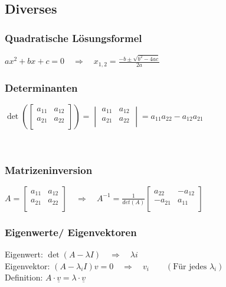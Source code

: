 	\subsection{Diverses}	
	\begin{minipage}[t]{9.5cm}
		\subsubsection{Quadratische Lösungsformel}
			$ax^2+bx+c=0\quad\Rightarrow\quad x_{1,2}=\frac{-b\pm\sqrt{b^2-4ac}}{2a}$
	\end{minipage}
	\hfill
	\begin{minipage}[t]{9.5cm}
		\subsubsection{Determinanten}
			$\det\left(
			\begin{bmatrix}
				a_{11}&a_{12}\\
				a_{21}&a_{22}\\
			\end{bmatrix}\right)=
			\begin{vmatrix}
				a_{11}&a_{12}\\
				a_{21}&a_{22}\\
			\end{vmatrix}=a_{11}a_{22}-a_{12}a_{21}$
	\end{minipage}\\
	
	
	\begin{minipage}[t]{9.5cm}
		\subsubsection{Matrizeninversion}
			$A=\begin{bmatrix}
						a_{11}&a_{12}\\
						a_{21}&a_{22}\\
				\end{bmatrix}\quad\Rightarrow\quad
			A^{-1}=\frac{1}{det(A)}
			\begin{bmatrix}
				a_{22}&-a_{12}\\
				-a_{21}&a_{11}\\
			\end{bmatrix}$
	\end{minipage}
	\hfill
	\begin{minipage}[t]{9.5cm}
		\subsubsection{Eigenwerte/ Eigenvektoren}
			Eigenwert: $\det(A-\lambda I)\quad\Rightarrow\quad \lambda i$\\
			Eigenvektor: $(A-\lambda_i I)v=0\quad\Rightarrow\quad v_i\qquad(\text{Für jedes }\lambda_i)$\\
			Definition: $ A\cdot \underline{v} = \lambda \cdot \underline{v} $
	\end{minipage}
	
